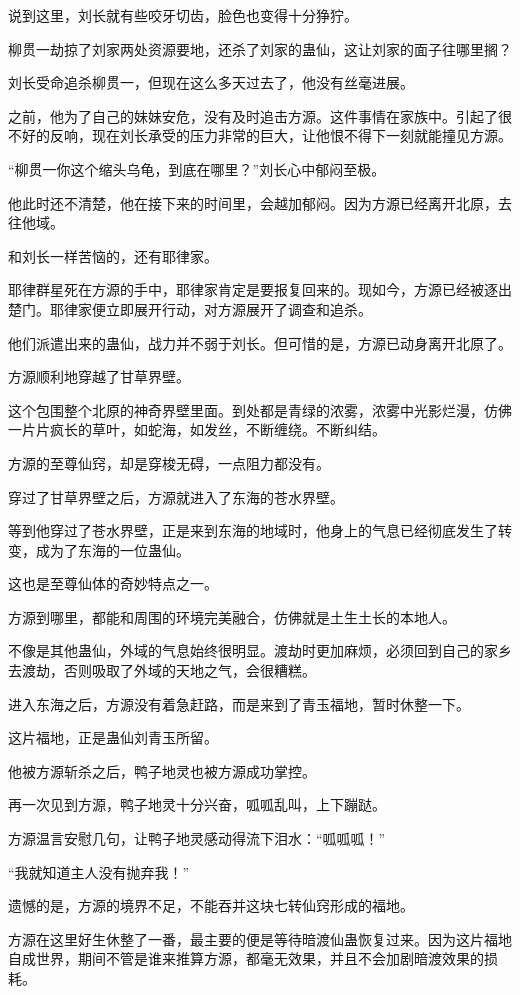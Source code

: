 \begin{this_body}
说到这里，刘长就有些咬牙切齿，脸色也变得十分狰狞。

柳贯一劫掠了刘家两处资源要地，还杀了刘家的蛊仙，这让刘家的面子往哪里搁？

刘长受命追杀柳贯一，但现在这么多天过去了，他没有丝毫进展。

之前，他为了自己的妹妹安危，没有及时追击方源。这件事情在家族中。引起了很不好的反响，现在刘长承受的压力非常的巨大，让他恨不得下一刻就能撞见方源。

“柳贯一你这个缩头乌龟，到底在哪里？”刘长心中郁闷至极。

他此时还不清楚，他在接下来的时间里，会越加郁闷。因为方源已经离开北原，去往他域。

和刘长一样苦恼的，还有耶律家。

耶律群星死在方源的手中，耶律家肯定是要报复回来的。现如今，方源已经被逐出楚门。耶律家便立即展开行动，对方源展开了调查和追杀。

他们派遣出来的蛊仙，战力并不弱于刘长。但可惜的是，方源已动身离开北原了。

方源顺利地穿越了甘草界壁。

这个包围整个北原的神奇界壁里面。到处都是青绿的浓雾，浓雾中光影烂漫，仿佛一片片疯长的草叶，如蛇海，如发丝，不断缠绕。不断纠结。

方源的至尊仙窍，却是穿梭无碍，一点阻力都没有。

穿过了甘草界壁之后，方源就进入了东海的苍水界壁。

等到他穿过了苍水界壁，正是来到东海的地域时，他身上的气息已经彻底发生了转变，成为了东海的一位蛊仙。

这也是至尊仙体的奇妙特点之一。

方源到哪里，都能和周围的环境完美融合，仿佛就是土生土长的本地人。

不像是其他蛊仙，外域的气息始终很明显。渡劫时更加麻烦，必须回到自己的家乡去渡劫，否则吸取了外域的天地之气，会很糟糕。

进入东海之后，方源没有着急赶路，而是来到了青玉福地，暂时休整一下。

这片福地，正是蛊仙刘青玉所留。

他被方源斩杀之后，鸭子地灵也被方源成功掌控。

再一次见到方源，鸭子地灵十分兴奋，呱呱乱叫，上下蹦跶。

方源温言安慰几句，让鸭子地灵感动得流下泪水：“呱呱呱！”

“我就知道主人没有抛弃我！”

遗憾的是，方源的境界不足，不能吞并这块七转仙窍形成的福地。

方源在这里好生休整了一番，最主要的便是等待暗渡仙蛊恢复过来。因为这片福地自成世界，期间不管是谁来推算方源，都毫无效果，并且不会加剧暗渡效果的损耗。


\end{this_body}
